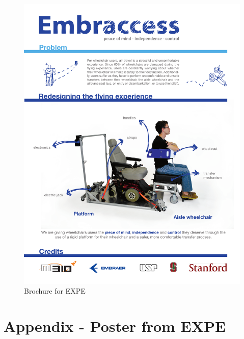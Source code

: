 \begin{figure}[h!]
	\centering
		\includegraphics[width=1\textwidth, page=2]{Figures/Brochure.pdf}
		\caption{Brochure for EXPE}
		\label{fig:brochure2}
\end{figure}

\chapter{Appendix - Poster from EXPE}


